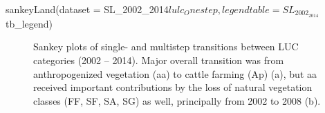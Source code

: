 \begin{Schunk}
\begin{Sinput}
sankeyLand(dataset = SL_2002_2014$lulc_Onestep,
           legendtable = SL_2002_2014$tb_legend)
\end{Sinput}
\end{Schunk}

\begin{Schunk}
\begin{figure}[htbp]

{\centering {}

}

\caption[Sankeys Plot 2002 - 2014]{Sankey plots of single- and multistep transitions between LUC categories (2002 – 2014). Major overall transition was from anthropogenized vegetation (aa) to cattle farming (Ap) (a), but aa received important contributions by the loss of natural vegetation classes (FF, SF, SA, SG) as well, principally from 2002 to 2008 (b).}\label{fig:sankeys}
\end{figure}
\end{Schunk}

